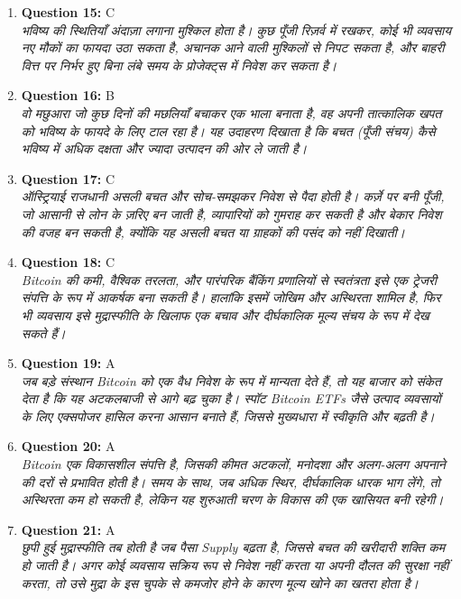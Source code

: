 \documentclass[12pt,a4paper]{article}
\begin{document}
\begin{enumerate}
\item \textbf{Question 15:} C
\\ \textit{भविष्य की स्थितियाँ अंदाज़ा लगाना मुश्किल होता है। कुछ पूँजी रिज़र्व में रखकर, कोई भी व्यवसाय नए मौकों का फायदा उठा सकता है, अचानक आने वाली मुश्किलों से निपट सकता है, और बाहरी वित्त पर निर्भर हुए बिना लंबे समय के प्रोजेक्ट्स में निवेश कर सकता है।}

\item \textbf{Question 16:} B
\\ \textit{वो मछुआरा जो कुछ दिनों की मछलियाँ बचाकर एक भाला बनाता है, वह अपनी तात्कालिक खपत को भविष्य के फायदे के लिए टाल रहा है। यह उदाहरण दिखाता है कि बचत (पूँजी संचय) कैसे भविष्य में अधिक दक्षता और ज्यादा उत्पादन की ओर ले जाती है।}

\item \textbf{Question 17:} C
\\ \textit{ऑस्ट्रियाई राजधानी असली बचत और सोच-समझकर निवेश से पैदा होती है। कर्ज़े पर बनी पूँजी, जो आसानी से लोन के ज़रिए बन जाती है, व्यापारियों को गुमराह कर सकती है और बेकार निवेश की वजह बन सकती है, क्योंकि यह असली बचत या ग्राहकों की पसंद को नहीं दिखाती।}

\item \textbf{Question 18:} C
\\ \textit{Bitcoin की कमी, वैश्विक तरलता, और पारंपरिक बैंकिंग प्रणालियों से स्वतंत्रता इसे एक ट्रेजरी संपत्ति के रूप में आकर्षक बना सकती है। हालांकि इसमें जोखिम और अस्थिरता शामिल है, फिर भी व्यवसाय इसे मुद्रास्फीति के खिलाफ एक बचाव और दीर्घकालिक मूल्य संचय के रूप में देख सकते हैं।}

\item \textbf{Question 19:} A
\\ \textit{जब बड़े संस्थान Bitcoin को एक वैध निवेश के रूप में मान्यता देते हैं, तो यह बाजार को संकेत देता है कि यह अटकलबाजी से आगे बढ़ चुका है। स्पॉट Bitcoin ETFs जैसे उत्पाद व्यवसायों के लिए एक्सपोजर हासिल करना आसान बनाते हैं, जिससे मुख्यधारा में स्वीकृति और बढ़ती है।}

\item \textbf{Question 20:} A
\\ \textit{Bitcoin एक विकासशील संपत्ति है, जिसकी कीमत अटकलों, मनोदशा और अलग-अलग अपनाने की दरों से प्रभावित होती है। समय के साथ, जब अधिक स्थिर, दीर्घकालिक धारक भाग लेंगे, तो अस्थिरता कम हो सकती है, लेकिन यह शुरुआती चरण के विकास की एक खासियत बनी रहेगी।}

\item \textbf{Question 21:} A
\\ \textit{छुपी हुई मुद्रास्फीति तब होती है जब पैसा Supply बढ़ता है, जिससे बचत की खरीदारी शक्ति कम हो जाती है। अगर कोई व्यवसाय सक्रिय रूप से निवेश नहीं करता या अपनी दौलत की सुरक्षा नहीं करता, तो उसे मुद्रा के इस चुपके से कमजोर होने के कारण मूल्य खोने का खतरा होता है।}


\end{enumerate}
\end{document}
